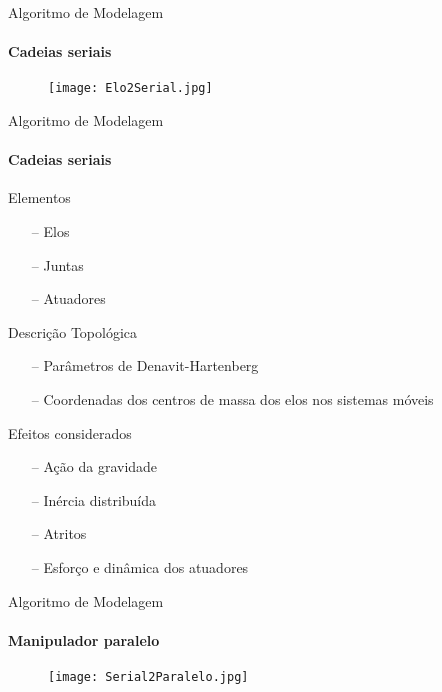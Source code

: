 \documentclass[25pt,landscape]{beamer}
\begin{document}
\begin{frame}{Algoritmo de Modelagem}
    \framesubtitle{Cadeias seriais}
	\begin{figure}[!h]
        \centering
        \texttt{[image: Elo2Serial.jpg]}
    \end{figure} 
\end{frame}

\begin{frame}{Algoritmo de Modelagem}
    \framesubtitle{Cadeias seriais}
    \begin{block}{Elementos}
		\begin{itemize}
			\item[--] Elos
			\item[--] Juntas
			\item[--] Atuadores
		\end{itemize}
    \end{block}
	\pause
    \begin{block}{Descrição Topológica}
		\begin{itemize}
			\item[--] Parâmetros de Denavit-Hartenberg
			\item[--] Coordenadas dos centros de massa dos elos nos sistemas móveis
		\end{itemize}
    \end{block}
	\pause
    \begin{block}{Efeitos considerados}
		\begin{itemize}
			\item[--] Ação da gravidade
			\item[--] Inércia distribuída
			\item[--] Atritos
			\item[--] Esforço e dinâmica dos atuadores
		\end{itemize}
    \end{block}
\end{frame}

\begin{frame}{Algoritmo de Modelagem}
    \framesubtitle{Manipulador paralelo}
	\begin{figure}[!h]
        \centering
        \texttt{[image: Serial2Paralelo.jpg]}
    \end{figure} 
\end{frame}
\end{document}
